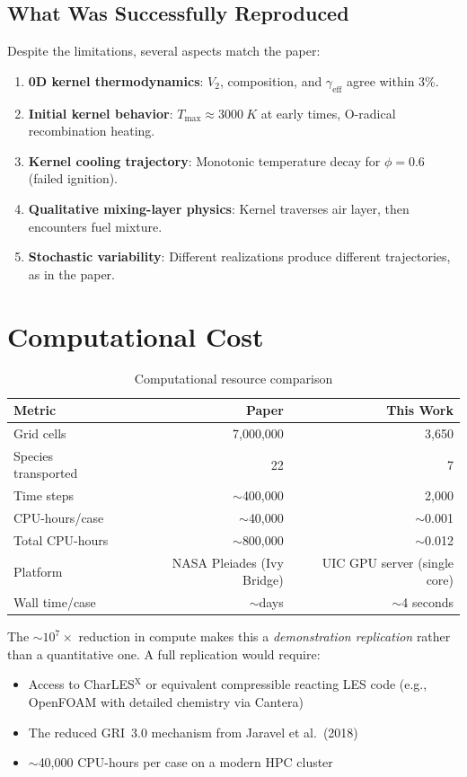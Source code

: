 \documentclass[11pt]{article}
\begin{document}
\subsection{What Was Successfully Reproduced}
Despite the limitations, several aspects match the paper:
\begin{enumerate}
    \item \textbf{0D kernel thermodynamics}: $V_2$, composition, and $\gamma_\mathrm{eff}$ agree within 3\%.
    \item \textbf{Initial kernel behavior}: $T_\mathrm{max} \approx \SI{3000}{K}$ at early times, O-radical recombination heating.
    \item \textbf{Kernel cooling trajectory}: Monotonic temperature decay for $\phi = 0.6$ (failed ignition).
    \item \textbf{Qualitative mixing-layer physics}: Kernel traverses air layer, then encounters fuel mixture.
    \item \textbf{Stochastic variability}: Different realizations produce different trajectories, as in the paper.
\end{enumerate}

\section{Computational Cost}

\begin{table}[H]
\centering
\caption{Computational resource comparison}
\label{tab:cost}
\small
\begin{tabular}{@{}lrr@{}}
\toprule
\textbf{Metric} & \textbf{Paper} & \textbf{This Work} \\
\midrule
Grid cells & 7,000,000 & 3,650 \\
Species transported & 22 & 7 \\
Time steps & $\sim$400,000 & 2,000 \\
CPU-hours/case & $\sim$40,000 & $\sim$0.001 \\
Total CPU-hours & $\sim$800,000 & $\sim$0.012 \\
Platform & NASA Pleiades (Ivy Bridge) & UIC GPU server (single core) \\
Wall time/case & $\sim$days & $\sim$4 seconds \\
\bottomrule
\end{tabular}
\end{table}

The $\sim10^{7}\times$ reduction in compute makes this a \emph{demonstration replication} rather than a quantitative one. A full replication would require:
\begin{itemize}
    \item Access to CharLES$^{\mathrm{X}}$ or equivalent compressible reacting LES code (e.g., OpenFOAM with detailed chemistry via Cantera)
    \item The reduced GRI~3.0 mechanism from Jaravel et al.\ (2018)
    \item $\sim$40,000 CPU-hours per case on a modern HPC cluster
\end{itemize}
\end{document}
